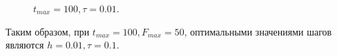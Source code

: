 \documentclass[a4paper,14pt]{article}
\begin{document}
\begin{figure}[!h]
	\caption{$t_{max} = 100, \tau = 0.01$.}
	\label{fig:100001}
\end{figure}

Таким образом, при $t_{max} = 100, F_{max} = 50$, оптимальными
значениями шагов являются $h = 0.01, \tau = 0.1$.
\end{document}
